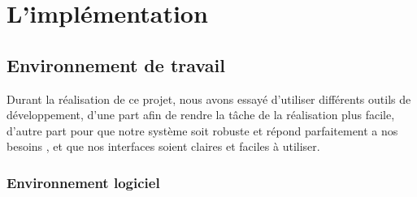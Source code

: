 \chapter{L’implémentation}

\section{Environnement de travail}
Durant la réalisation de ce projet, nous avons essayé d’utiliser différents
outils de développement, d’une part afin de rendre la tâche de la
réalisation plus facile, d’autre part pour que notre système soit robuste et
répond parfaitement a nos besoins , et que nos interfaces soient claires et
faciles à utiliser.
\subsection{Environnement logiciel}

